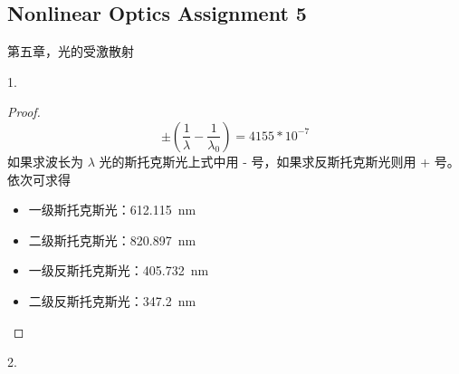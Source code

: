 \subsection{Nonlinear Optics Assignment 5}

第五章，光的受激散射
\begin{exercise}
    1.
\end{exercise}

\begin{proof}
    $$\pm(\frac{1}{\lambda }-\frac{1}{\lambda_0})=4155*10^{-7} $$
    如果求波长为 $\lambda$ 光的斯托克斯光上式中用 - 号，如果求反斯托克斯光则用 + 号。依次可求得
    \begin{itemize}
        \item 一级斯托克斯光：\SI{612.115}{nm}
        \item 二级斯托克斯光：\SI{820.897}{nm}
        \item 一级反斯托克斯光：\SI{405.732}{nm}
        \item 二级反斯托克斯光：\SI{347.2}{nm}
    \end{itemize}
\end{proof}

\begin{exercise}
    2.
\end{exercise}


